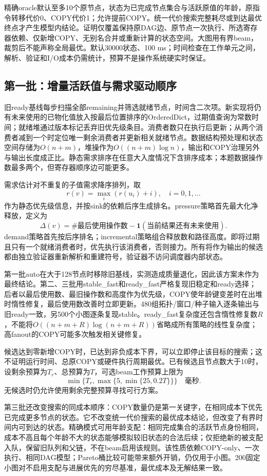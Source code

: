 \documentclass[UTF8,11pt,fontset=fandol]{ctexart}
\begin{document}
精确oracle默认至多10个原节点，状态为已完成节点集合与活跃原值的年龄，原指令转移代价0、COPY代价1；允许提前COPY。统一代价搜索完整耗尽或到达最优终点才产生模型内结论。证明仅覆盖保持原DAG边、原节点一次执行、所选寄存器依赖、仅新增COPY、无别名合并或重新计算的状态空间。大图用有界beam，裁剪后不能声称全局最优。默认30000状态、100 ms；时间检查在工作单元之间，解析、验证和I/O成本仍需统计，预算不是操作系统硬实时保证。

\subsection{第一批：增量活跃值与需求驱动顺序}
旧ready基线每步扫描全部remaining并筛选就绪节点，时间含二次项。新实现将仍有未来使用的已物化值放入按最后位置排序的OrderedDict，过期值查询为常数时间；就绪堆通过版本标记丢弃旧优先级条目。消费者数只在执行后更新；从两个消费者减到一个时定位唯一剩余消费者并更新相关就绪节点。数据结构预处理和状态空间存储为$O(n+m)$，堆操作为$O((n+m)\log n)$，输出和COPY治理另外与输出长度成正比。静态需求排序在任意大入度情况下含排序成本；本题数据操作数最多两个，但寄存器顺序边可能更多。

需求估计对不重复的子值需求降序排列，取\[r(v)=\max_i(r(u_i)+i),\quad i=0,1,\ldots\]作为静态优先级信息，并按sink的依赖后序生成排名。pressure策略首先最大化净释放，定义为\[\Delta(v)=\#\text{最后使用操作数}-\mathbf1(\text{当前结果还有未来使用}) .\]demand策略首先按后序排名；incremental策略组合释放数和路径高度。即将过期且只有一个就绪消费者时，优先执行该消费者，否则接力。所有将作为输出的候选都由独立验证器重新解析和重建符号，验证器不访问调度器内部状态。

第一批auto在大于128节点时移除旧基线，实测造成质量退化，因此该方案未作为最终结论。第二、三批用stable\_fast和ready\_fast严格复现旧稳定和ready选择；后者以最后使用数、最旧操作数和高度作为优先级，COPY使年龄键变差时在出堆时惰性修复，最后使用数改善时立即更新。480组拓扑/窗口/种子输入逐条输出与旧ready一致，另500个小图逐条复现stable。ready\_fast复杂度还包含惰性修复数$R$，不能将$O((n+m+R)\log(n+m+R))$省略成所有策略的线性复杂度；高fanout的COPY可能多次触发相关键修复。

候选达到零新增COPY时，已达到非负成本下界，可以立即停止该目标的搜索；这不证明运行时间、总原COPY或硬件执行周期最优。已有候选且节点数大于10时，设剩余预算为$T_r$、总预算为$T$，可选beam工作预算上限为\[\min\{T_r,\max\{5,\min\{25,0.2T\}\}\}\quad\text{毫秒}.\]无候选时仍允许使用剩余完整预算寻找可行方案。

第三批还改变搜索的同成本顺序：COPY数量仍是第一关键字，在相同成本下优先已完成更多节点的状态。它不改变统一代价搜索的最优成本结论，但改变了有界时间内可到达的状态。精确模式可用年龄支配：相同完成集合的活跃节点身份相同，成本不高且每个年龄不大的状态能够模拟较旧状态的合法后续；仅拒绝新的被支配入队，保留旧队列和父链，不在beam启用该规则。该性质依赖COPY-only、一次执行、相同DAG模型；Pareto桶比较可能带来额外开销，仍仅用于小图。200固定小图对不启用支配与进展优先的穷尽基准，最优成本及无解结果一致。
\end{document}
